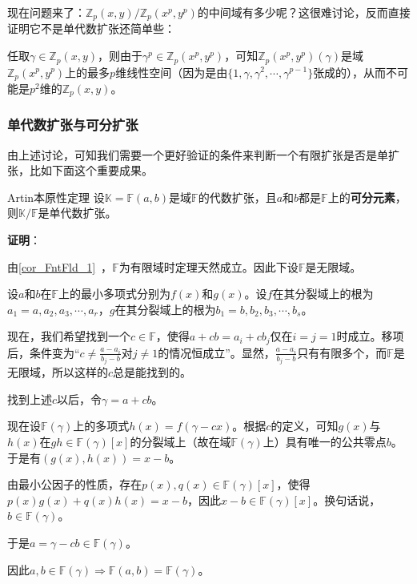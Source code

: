 现在问题来了：$\mathbb{Z}_p(x, y)/\mathbb{Z}_p(x^p, y^p)$的中间域有多少呢？这很难讨论，反而直接证明它不是单代数扩张还简单些：

任取$\gamma\in\mathbb{Z}_p(x, y)$，则由于$\gamma^p\in\mathbb{Z}_p(x^p, y^p)$，可知$\mathbb{Z}_p(x^p, y^p)(\gamma)$是域$\mathbb{Z}_p(x^p, y^p)$上的最多$p$维线性空间（因为是由$\{1,\gamma, \gamma^2, \cdots, \gamma^{p-1}\}$张成的），从而不可能是$p^2$维的$\mathbb{Z}_p(x, y)$。


\subsubsection{单代数扩张与可分扩张}

由上述讨论，可知我们需要一个更好验证的条件来判断一个有限扩张是否是单扩张，比如下面这个重要成果。

\begin{theorem}{Artin本原性定理}\label{the_PrmtEl_2}
设$\mathbb{K}=\mathbb{F}(a, b)$是域$\mathbb{F}$的代数扩张，且$a$和$b$都是$\mathbb{F}$上的\textbf{可分元素}，则$\mathbb{K}/\mathbb{F}$是单代数扩张。
\end{theorem}

\textbf{证明}：

由\autoref{cor_FntFld_1}~，$\mathbb{F}$为有限域时定理天然成立。因此下设$\mathbb{F}$是无限域。

设$a$和$b$在$\mathbb{F}$上的最小多项式分别为$f(x)$和$g(x)$。设$f$在其分裂域上的根为$a_1=a, a_2, a_3, \cdots, a_r$，$g$在其分裂域上的根为$b_1=b, b_2, b_3, \cdots, b_s$。

现在，我们希望找到一个$c\in\mathbb{F}$，使得$a+cb=a_i+cb_j$仅在$i=j=1$时成立。移项后，条件变为“$c\neq\frac{a-a_i}{b_j-b}$对$j\neq 1$的情况恒成立”。显然，$\frac{a-a_i}{b_j-b}$只有有限多个，而$\mathbb{F}$是无限域，所以这样的$c$总是能找到的。

找到上述$c$以后，令$\gamma=a+cb$。

现在设$\mathbb{F}(\gamma)$上的多项式$h(x)=f(\gamma-cx)$。根据$c$的定义，可知$g(x)$与$h(x)$在$gh\in\mathbb{F}(\gamma)[x]$的分裂域上（故在域$\mathbb{F}(\gamma)$上）具有唯一的公共零点$b$。于是有$(g(x), h(x))=x-b$。

由最小公因子的性质，存在$p(x), q(x)\in\mathbb{F}(\gamma)[x]$，使得$p(x)g(x)+q(x)h(x)=x-b$，因此$x-b\in\mathbb{F}(\gamma)[x]$。换句话说，$b\in\mathbb{F}(\gamma)$。

于是$a=\gamma-cb\in\mathbb{F}(\gamma)$。

因此$a, b\in\mathbb{F}(\gamma)\Rightarrow \mathbb{F}(a, b)=\mathbb{F}(\gamma)$。

